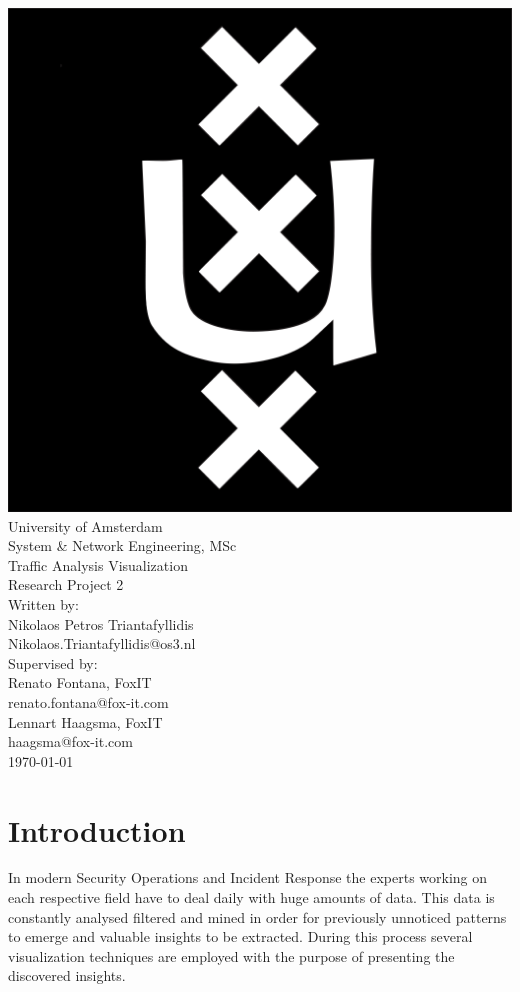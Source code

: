 \documentclass[16pt]{extreport}
\begin{document}
\begin{center}
\includegraphics[scale=0.07]{logo.png}\\
\huge{University of Amsterdam}\\
\huge{System \& Network Engineering, MSc}\\[1cm]
\Huge{Traffic Analysis Visualization}\\[0.2cm] 
\Large{Research Project 2}\\[2cm]
\large{Written by:}\\
\Large{Nikolaos Petros Triantafyllidis}\\
\large{Nikolaos.Triantafyllidis@os3.nl}\\[0.3cm]
\large{Supervised by:}\\
\Large{Renato Fontana, FoxIT}\\
\large{renato.fontana@fox-it.com}\\[0.1cm]
\Large{Lennart Haagsma, FoxIT}\\
\large{haagsma@fox-it.com}\\[4cm]
\today
\end{center}
\thispagestyle{empty}
\clearpage

\tableofcontents
 

\newpage
\chapter{Introduction}
\justify
\large{In modern Security Operations and Incident Response the experts working on each respective field have to deal daily with huge amounts of data. This data is constantly analysed filtered and mined in order for previously unnoticed patterns to emerge and valuable insights to be extracted. During this process several visualization techniques are employed with the purpose of presenting the discovered insights. }
\end{document}
